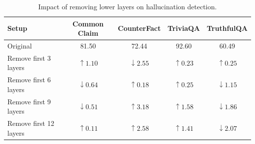 \begin{table}[t]
    \centering
    \tiny
    \setlength{\tabcolsep}{2.5mm}
    \begin{tabular}{lcccc}
        \toprule
        \textbf{Setup} & \textbf{Common Claim} & \textbf{CounterFact} & \textbf{TriviaQA} & \textbf{TruthfulQA} \\
        \midrule
        Original &81.50&72.44&92.60&60.49\\
        \midrule
        Remove first 3 layers &$\uparrow 1.10$&$\downarrow 2.55$&$\uparrow 0.23$&$\uparrow 0.25$\\
        Remove first 6 layers &$\downarrow 0.64$&$\uparrow 0.18$&$\uparrow 0.25$&$\downarrow 1.15$\\
        Remove first 9 layers &$\downarrow 0.51$&$\uparrow 3.18$&$\uparrow 1.58$&$\downarrow 1.86$\\
        Remove first 12 layers &$\uparrow 0.11$&$\uparrow 2.58$&$\uparrow 1.41$&$\downarrow 2.07$\\
        \bottomrule
    \end{tabular}
    \caption{Impact of removing lower layers on hallucination detection.}
    \label{tab:lower_layer_ablation}
\end{table}

